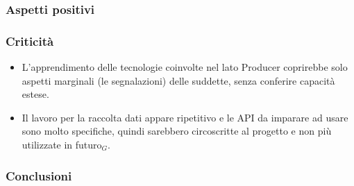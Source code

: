 \subsubsection{Aspetti positivi}

\subsubsection{Criticità}
\begin{itemize}
	\item L'apprendimento delle tecnologie coinvolte nel lato 
	Producer coprirebbe solo aspetti marginali (le segnalazioni) delle
	suddette, senza conferire capacità estese. 
	\item Il lavoro per la raccolta dati appare ripetitivo e le
	 API da imparare ad usare sono molto specifiche, quindi sarebbero 
	 circoscritte al progetto e non più utilizzate in futuro$_{G}$. 
	 

\end{itemize}
\subsubsection{Conclusioni}